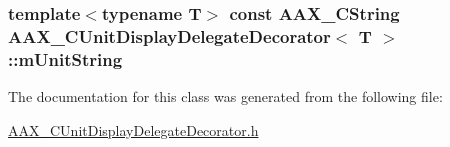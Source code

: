 \subsubsection[{m\+Unit\+String}]{\setlength{\rightskip}{0pt plus 5cm}template$<$typename T$>$ const {\bf A\+A\+X\+\_\+\+C\+String} {\bf A\+A\+X\+\_\+\+C\+Unit\+Display\+Delegate\+Decorator}$<$ T $>$\+::m\+Unit\+String\hspace{0.3cm}{\ttfamily [protected]}}\label{a00045_a4ea845f56cbb837f9b45901f022336d0}


The documentation for this class was generated from the following file\+:\begin{DoxyCompactItemize}
\item 
\hyperlink{a00199}{A\+A\+X\+\_\+\+C\+Unit\+Display\+Delegate\+Decorator.\+h}\end{DoxyCompactItemize}
